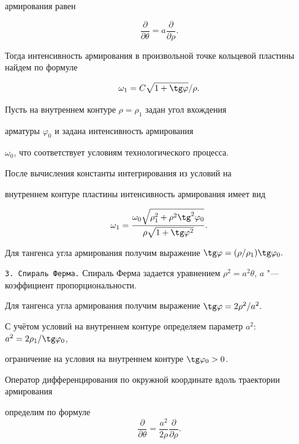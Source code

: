 армирования равен

$$\dfrac{\partial}{\partial\theta}=a\dfrac{\partial}{\partial\rho}.$$

 Тогда интенсивность армирования в произвольной точке кольцевой пластины найдем по формуле


$$

\omega_1={C\sqrt{1+\tg \varphi}}/{\rho}.

$$


Пусть на внутреннем контуре $\rho=\rho_1$ задан угол вхождения

арматуры $\varphi_0$ и задана  интенсивность армирования

$\omega_0$, что соответствует условиям технологического процесса.

 После вычисления константы интегрирования из условий на

 внутреннем контуре пластины интенсивность армирования имеет вид

\begin{equation*}

\omega_1=\dfrac{\omega_0\sqrt{\rho_1^2+\rho^2\tg

^2\varphi_0}}{\rho \sqrt{1+\tg\varphi^2}}.

\end{equation*}

Для тангенса угла армирования получим выражение $\tg

\varphi=(\rho/\rho_1)\tg \varphi_0.$



\smallskip



{\tt 3. Спираль Ферма.}  Спираль Ферма задается уравнением $\rho^2=a^2\theta$, $a$ "--- коэффициент пропорциональности.

 Для тангенса угла армирования получим выражение $\tg \varphi={2\rho^2}/{a^2}.$

 С учётом условий на внутреннем контуре определяем параметр $a^2$: $a^2={2\rho_1}/{\tg \varphi_0}$,

 ограничение на условия на внутреннем контуре $\tg \varphi_0>0$.



 Оператор дифференцирования по окружной координате вдоль траектории армирования

 определим по формуле $$\dfrac{\partial}{\partial\theta}=\dfrac{a^2}{2\rho}\dfrac{\partial}{\partial\rho}.$$

